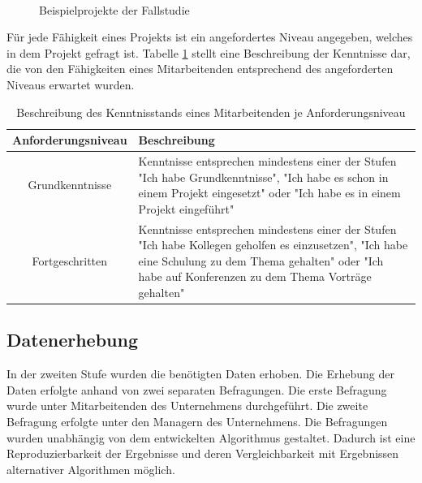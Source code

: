 \begin{figure}[H]
    \\
\caption[Beispielprojekte der Fallstudie]{Beispielprojekte der Fallstudie}
  \label{fig:methodik:abb2}
\end{figure}

Für jede Fähigkeit eines Projekts ist ein angefordertes Niveau angegeben, welches in dem Projekt gefragt ist.
Tabelle \ref{tab:methodik:tab1} stellt eine Beschreibung der Kenntnisse dar, die von den Fähigkeiten eines Mitarbeitenden entsprechend des angeforderten Niveaus erwartet wurden.

\begin{table}[htbp]
    \begin{center}
    \begin{tabular}{c|p{3.5in}}
    {\textbf{Anforderungsniveau}} & {\textbf{Beschreibung}}\\
    \hline
	Grundkenntnisse & Kenntnisse entsprechen mindestens einer der Stufen "Ich habe Grundkenntnisse", "Ich habe es schon in einem Projekt eingesetzt" oder "Ich habe es in einem Projekt eingeführt" \\
    \hline
    Fortgeschritten & Kenntnisse entsprechen mindestens einer der Stufen "Ich habe Kollegen geholfen es einzusetzen", "Ich habe eine Schulung zu dem Thema gehalten" oder "Ich habe auf Konferenzen zu dem Thema Vorträge gehalten" \\
    \end{tabular}
    \end{center}
    \caption[Beschreibung des Kenntnisstands eines Mitarbeitenden je Anforderungsniveau]{Beschreibung des Kenntnisstands eines Mitarbeitenden je Anforderungsniveau}
	\label{tab:methodik:tab1}
\end{table}

\subsection{Datenerhebung}
In der zweiten Stufe wurden die benötigten Daten erhoben.
Die Erhebung der Daten erfolgte anhand von zwei separaten Befragungen.
Die erste Befragung wurde unter Mitarbeitenden des Unternehmens durchgeführt.
Die zweite Befragung erfolgte unter den Managern des Unternehmens.
Die Befragungen wurden unabhängig von dem entwickelten Algorithmus gestaltet.
Dadurch ist eine Reproduzierbarkeit der Ergebnisse und deren Vergleichbarkeit mit Ergebnissen alternativer Algorithmen möglich.

